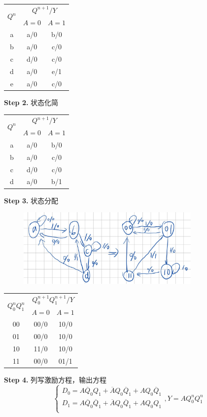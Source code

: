 \documentclass[a4paper,11pt,UTF8]{article}
\begin{document}
\begin{table}[H]
	\centering
	\begin{tabular}{|c|c|c|}
		\hline
		\multirow{2}{*}{$Q^n$} &\multicolumn{2}{c|}{$Q^{n+1}/Y$}\\
		\cline{2-3}
		& $A=0$ & $A=1$ \\
		\hline
		a&a/0&b/0\\
		b&a/0&c/0\\
		c&d/0&c/0\\
		d&a/0&e/1\\
		e&a/0&c/0\\
		\hline
	\end{tabular}
\end{table}
\textbf{Step 2.} 状态化简
\begin{table}[H]
	\centering
	\begin{tabular}{|c|c|c|}
		\hline
		\multirow{2}{*}{$Q^n$} &\multicolumn{2}{c|}{$Q^{n+1}/Y$}\\
		\cline{2-3}
		& $A=0$ & $A=1$ \\
		\hline
		a&a/0&b/0\\
		b&a/0&c/0\\
		c&d/0&c/0\\
		d&a/0&b/1\\
		\hline
	\end{tabular}
\end{table}
\textbf{Step 3.} 状态分配
\begin{figure}[H]
	\centering
	\includegraphics[width=0.8\textwidth]{6.3.6_2}
\end{figure}
\begin{table}[H]
	\centering
	\begin{tabular}{|c|c|c|}
		\hline
		\multirow{2}{*}{$Q_0^nQ_1^n$} &\multicolumn{2}{c|}{$Q_0^{n+1}Q_1^{n+1}/Y$}\\
		\cline{2-3}
		& $A=0$ & $A=1$ \\
		\hline
		00&00/0&10/0\\
		01&00/0&10/0\\
		10&11/0&10/0\\
		11&00/0&01/1\\
		\hline
	\end{tabular}
\end{table}
\textbf{Step 4.} 列写激励方程，输出方程
$$
\begin{cases}
D_{0} =A\overline{Q}_{0}Q_{1}+\overline{A}Q_{0}\overline{Q}_{1}+AQ_{0}\overline{Q}_{1} \\
D_{1} =A\overline{Q}_{0}\overline{Q}_{1}+\overline{A}Q_{0}\overline{Q}_{1}+AQ_{0}Q_{1} \\
\end{cases}
,Y=AQ_{0}^{n}Q_{1}^{n} 
$$
\end{document}
